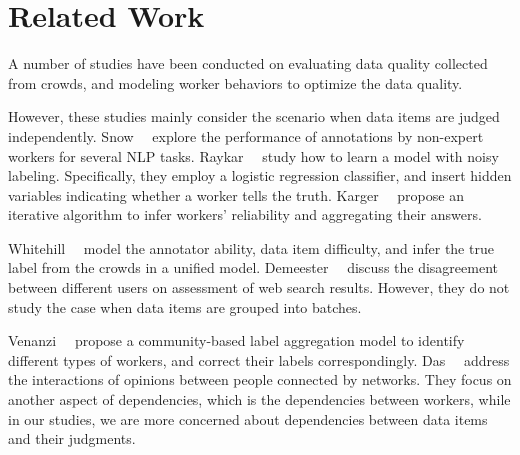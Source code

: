 

\section{Related Work}
\label{sec:related}




A number of studies have been conducted on evaluating data quality collected from crowds, 
and modeling worker behaviors to optimize the data quality.  

However, these studies mainly consider the scenario when data items are judged independently.  
Snow~\etal~\cite{snow:emnlp2008} explore the performance of annotations by non-expert workers for several NLP tasks.
Raykar~\etal~\cite{raykar:nips2011ranking,raykar:icml2009,raykar:jmlr2010}
study how to learn a model with noisy labeling. 
Specifically, they employ a logistic regression classifier, 
and insert hidden variables indicating whether a worker tells the truth. 
Karger~\etal~\cite{karger:nips2011} propose an iterative algorithm to infer workers' reliability 
and aggregating their answers.  

Whitehill~\etal~\cite{whitehill:nips2009} model the annotator ability, data item difficulty, and infer the true label from the crowds in a unified model.
Demeester~\etal~\cite{demeester:wsdm2014} discuss the disagreement between different users on assessment of web search results.
However, they do not study the case when data items are grouped into batches.

Venanzi~\etal~\cite{venanzi:www2014} propose a community-based label aggregation model to identify different types of workers, 
and correct their labels correspondingly.  
Das~\etal~\cite{das:kdd2013} address the interactions of opinions between people connected by networks.
They focus on another aspect of dependencies, 
which is the dependencies between workers, 
while in our studies, we are more concerned about dependencies between data items and their judgments.  

